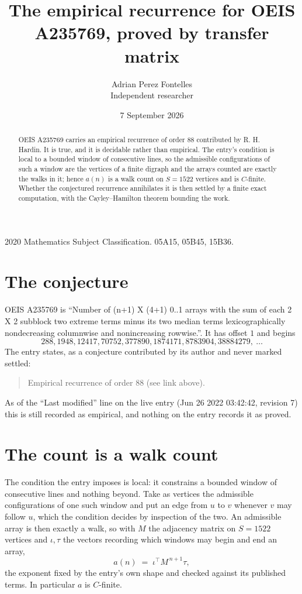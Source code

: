 \documentclass[11pt,a4paper]{article}
\title{The empirical recurrence for OEIS A235769, proved by transfer matrix}
\author{Adrian Perez Fontelles\\ \small Independent researcher}
\date{7 September 2026}
\theoremstyle{plain}
\theoremstyle{definition}
\begin{document}
\maketitle

\begin{abstract}
OEIS A235769 carries an empirical recurrence of order $88$ contributed by R. H. Hardin. It is
true, and it is decidable rather than empirical. The entry's condition is local to a bounded window of consecutive lines, so
the admissible configurations of such a window are the vertices of a finite digraph and the
arrays counted are exactly the walks in it; hence $a(n)$ is a walk count on $S=1522$ vertices
and is $C$-finite. Whether the conjectured recurrence annihilates it is then settled by a
finite exact computation, with the Cayley--Hamilton theorem bounding the work.
\end{abstract}

\noindent\small 2020 Mathematics Subject Classification. 05A15, 05B45, 15B36.\normalsize

\section{The conjecture}

OEIS A235769 is ``Number of (n+1) X (4+1) 0..1 arrays with the sum of each 2 X 2 subblock two extreme terms minus its two median terms lexicographically nondecreasing columnwise and nonincreasing rowwise.''. It has offset $1$ and begins
\[
288, 1948, 12417, 70752, 377890, 1874171, 8783904, 38884279,\ \dots
\]
The entry states, as a conjecture contributed by its author and never marked settled:
\begin{quote}
Empirical recurrence of order 88 (see link above).
\end{quote}
As of the ``Last modified'' line on the live entry (Jun 26 2022 03:42:42, revision 7) this is still
recorded as empirical, and nothing on the entry records it as proved.

\section{The count is a walk count}

The condition the entry imposes is local: it constrains a bounded window of consecutive lines and nothing beyond. Take as
vertices the admissible configurations of one such window and put an edge from $u$ to $v$
whenever $v$ may follow $u$, which the condition decides by inspection of the two. An
admissible array is then exactly a walk, so with $M$ the adjacency matrix on $S=1522$ vertices
and $\iota,\tau$ the vectors recording which windows may begin and end an array,
\[
a(n)\;=\;\iota^{\!\top}M^{\,n+1}\tau ,
\]
the exponent fixed by the entry's own shape and checked against its published terms. In
particular $a$ is $C$-finite.
\end{document}

